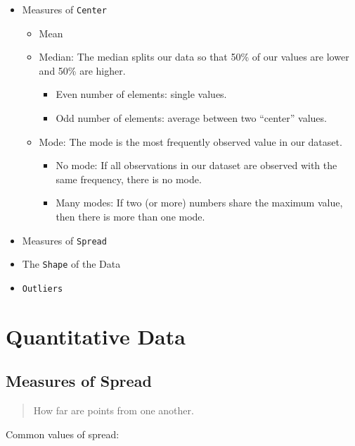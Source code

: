 \documentclass[]{book}
\providecommand{\tightlist}{%
  \setlength{\itemsep}{0pt}\setlength{\parskip}{0pt}}
\begin{document}
\begin{itemize}
\tightlist
\item
  Measures of \texttt{Center}

  \begin{itemize}
  \tightlist
  \item
    Mean
  \item
    Median: The median splits our data so that 50\% of our values are
    lower and 50\% are higher.

    \begin{itemize}
    \tightlist
    \item
      Even number of elements: single values.
    \item
      Odd number of elements: average between two ``center'' values.
    \end{itemize}
  \item
    Mode: The mode is the most frequently observed value in our dataset.

    \begin{itemize}
    \tightlist
    \item
      No mode: If all observations in our dataset are observed with the
      same frequency, there is no mode.
    \item
      Many modes: If two (or more) numbers share the maximum value, then
      there is more than one mode.
    \end{itemize}
  \end{itemize}
\item
  Measures of \texttt{Spread}
\item
  The \texttt{Shape} of the Data
\item
  \texttt{Outliers}
\end{itemize}

\section{Quantitative Data}\label{quantitative-data}

\subsection{Measures of Spread}\label{measures-of-spread}

\begin{quote}
How far are points from one another.
\end{quote}

Common values of spread:
\end{document}
